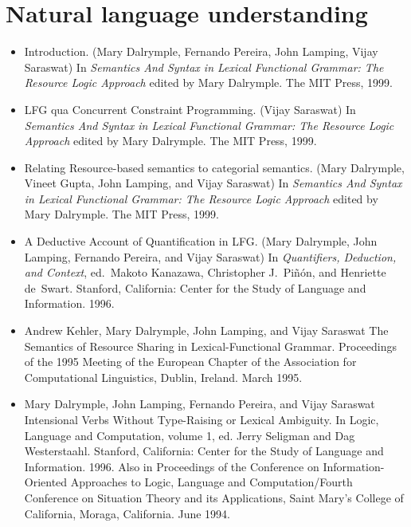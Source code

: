 \documentclass{article}
\begin{document}


\section*{Natural language understanding}

\begin{itemize}
\item Introduction. (Mary Dalrymple, Fernando Pereira, John Lamping, Vijay
Saraswat) In \textit{Semantics And Syntax in Lexical Functional
Grammar: The Resource Logic Approach} edited by Mary Dalrymple. The
MIT Press, 1999. 

\item LFG qua Concurrent Constraint Programming. (Vijay Saraswat) In
    \textit{ Semantics And Syntax in Lexical Functional Grammar: The
    Resource Logic Approach} edited by Mary Dalrymple. The MIT Press, 1999.

\item Relating Resource-based semantics to categorial semantics. (Mary
    Dalrymple, Vineet Gupta, John Lamping, and Vijay Saraswat) In
   \textit{ Semantics And Syntax in Lexical Functional Grammar: The Resource
    Logic Approach} edited by Mary Dalrymple. The MIT Press, 1999.

\item A Deductive Account of Quantification in LFG.  (Mary
    Dalrymple, John Lamping, Fernando Pereira, and Vijay
    Saraswat) In \textit{ Quantifiers, Deduction, and Context}, ed.\
    Makoto Kanazawa, Christopher J.~Pi\~{n}\'{o}n, and Henriette
    de~Swart.  Stanford, California: Center for the Study of
    Language and Information.  1996. 

\item Andrew Kehler, Mary Dalrymple, John Lamping, and Vijay Saraswat
    The Semantics of Resource Sharing in Lexical-Functional Grammar.  
    Proceedings of the 1995 Meeting of the
    European Chapter of the Association for Computational
    Linguistics, Dublin, Ireland. March 1995.

\item Mary Dalrymple, John Lamping, Fernando Pereira, and Vijay Saraswat
    Intensional Verbs Without Type-Raising or Lexical Ambiguity.
    In Logic, Language and Computation, volume 1, ed. Jerry
    Seligman and Dag Westerstaahl. Stanford, California:
    Center for the Study of Language and Information.  1996.
    Also in Proceedings of the Conference on
    Information-Oriented Approaches to Logic, Language and
    Computation/Fourth Conference on Situation Theory and its 
    Applications, Saint Mary's College of California, Moraga,
    California. June 1994.


\end{itemize}
\end{document}
